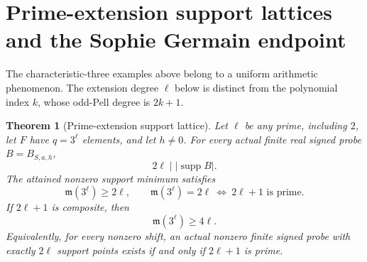 \documentclass[11pt]{article}
\newtheorem{theorem}{Theorem}[section]
\begin{document}
\section{Prime-extension support lattices and the Sophie Germain endpoint}
\label{sec:odd-pell-prime-extension}

The characteristic-three examples above belong to a uniform arithmetic
phenomenon. The extension degree \(\ell\) below is distinct from the
polynomial index \(k\), whose odd-Pell degree is \(2k+1\).

\begin{theorem}[Prime-extension support lattice]
\label{thm:odd-pell-prime-extension}
Let \(\ell\) be any prime, including \(2\), let \(F\) have
\(q=3^\ell\) elements, and let \(h\ne0\).
For every actual finite real signed probe \(B=B_{S,a,h}\),
\[
                         2\ell\mid|\operatorname{supp}B|.
\]
The attained nonzero support minimum satisfies
\[
 \mathfrak m(3^\ell)\ge2\ell,\qquad
 \mathfrak m(3^\ell)=2\ell
          \ \Longleftrightarrow\ 2\ell+1\text{ is prime}.
\]
If \(2\ell+1\) is composite, then
\[
                         \mathfrak m(3^\ell)\ge4\ell.
\]
Equivalently, for every nonzero shift, an actual nonzero finite
signed probe with exactly \(2\ell\) support points exists if and
only if \(2\ell+1\) is prime.
\end{theorem}
\end{document}
